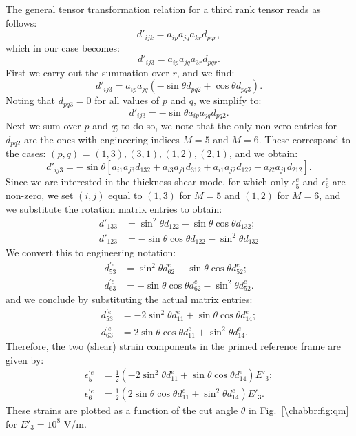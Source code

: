 The general tensor transformation relation for a third rank tensor reads as follows:
\[
	d'_{ijk} = a_{ip}a_{jq}a_{kr}d_{pqr},
\]
which in our case becomes:
\[
	d'_{ij3} = a_{ip}a_{jq}a_{3r}d_{pqr}.
\]
First we carry out the summation over $r$, and we find:
\[
	d'_{ij3} = a_{ip}a_{jq}(-\sin\theta d_{pq2} + \cos\theta d_{pq3}).
\]
Noting that $d_{pq3}=0$ for all values of $p$ and $q$, we simplify to:
\[
	d'_{ij3} = -\sin\theta a_{ip}a_{jq}d_{pq2}.
\]
Next we sum over $p$ and $q$; to do so, we note that the only non-zero entries for $d_{pq2}$ are the ones with engineering indices $M=5$ and $M=6$.  These correspond to the cases: $(p,q)$ = $(1,3),(3,1),(1,2),(2,1)$, and we obtain:
\[
	d'_{ij3} = -\sin\theta \left[a_{i1}a_{j3}d_{132}+a_{i3}a_{j1}d_{312}+a_{i1}a_{j2}d_{122}+a_{i2}a_{j1}d_{212}\right].
\]
Since we are interested in the thickness shear mode, for which only $\epsilon^e_5$ and $\epsilon^e_6$ are non-zero, we set $(i,j)$ equal to $(1,3)$ for $M=5$ and $(1,2)$ for $M=6$, and we substitute the rotation matrix entries to obtain:
\begin{eqnarray*}
	d'_{133} &= \sin^2\theta d_{122}-\sin\theta\cos\theta d_{132};\\
	d'_{123} &= -\sin\theta\cos\theta d_{122} - \sin^2\theta d_{132}
\end{eqnarray*}
We convert this to engineering notation:
\begin{eqnarray*}
	d^{\prime e}_{53} &= \sin^2\theta d^e_{62}-\sin\theta\cos\theta d^e_{52};\\
	d^{\prime e}_{63} &= -\sin\theta\cos\theta d^e_{62} - \sin^2\theta d^e_{52}.
\end{eqnarray*}
and we conclude by substituting the actual matrix entries:
\begin{eqnarray*}
	d^{\prime e}_{53} &= -2\sin^2\theta d^e_{11}+\sin\theta\cos\theta d^e_{14};\\
	d^{\prime e}_{63} &= 2\sin\theta\cos\theta d^e_{11} + \sin^2\theta d^e_{14}.
\end{eqnarray*}
Therefore, the two (shear) strain components in the primed reference frame are given by:
\begin{eqnarray*}
	\epsilon^{\prime e}_{5} &= \frac{1}{2}(-2\sin^2\theta d^e_{11}+\sin\theta\cos\theta d^e_{14})E'_3;\\
	\epsilon^{\prime e}_{6} &= \frac{1}{2}(2\sin\theta\cos\theta d^e_{11} + \sin^2\theta d^e_{14})E'_3.
\end{eqnarray*}
These strains are plotted as a function of the cut angle $\theta$ in Fig.~\ref{\chabbr:fig:qm} for $E'_3=10^8$ V/m.

